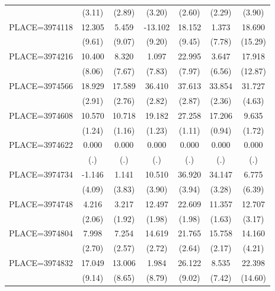{\begin{tabular}{l*{6}{c}}
                    &      (3.11)&      (2.89)&      (3.20)&      (2.60)&      (2.29)&      (3.90)\\
PLACE=3974118       &      12.305&       5.459&     -13.102&      18.152&       1.373&      18.690\\
                    &      (9.61)&      (9.07)&      (9.20)&      (9.45)&      (7.78)&     (15.29)\\
PLACE=3974216       &      10.400&       8.320&       1.097&      22.995&       3.647&      17.918\\
                    &      (8.06)&      (7.67)&      (7.83)&      (7.97)&      (6.56)&     (12.87)\\
PLACE=3974566       &      18.929&      17.589&      36.410&      37.613&      33.854&      31.727\\
                    &      (2.91)&      (2.76)&      (2.82)&      (2.87)&      (2.36)&      (4.63)\\
PLACE=3974608       &      10.570&      10.718&      19.182&      27.258&      17.206&       9.635\\
                    &      (1.24)&      (1.16)&      (1.23)&      (1.11)&      (0.94)&      (1.72)\\
PLACE=3974622       &       0.000&       0.000&       0.000&       0.000&       0.000&       0.000\\
                    &         (.)&         (.)&         (.)&         (.)&         (.)&         (.)\\
PLACE=3974734       &      -1.146&       1.141&      10.510&      36.920&      34.147&       6.775\\
                    &      (4.09)&      (3.83)&      (3.90)&      (3.94)&      (3.28)&      (6.39)\\
PLACE=3974748       &       4.216&       3.217&      12.497&      22.609&      11.357&      12.707\\
                    &      (2.06)&      (1.92)&      (1.98)&      (1.98)&      (1.63)&      (3.17)\\
PLACE=3974804       &       7.998&       7.254&      14.619&      21.765&      15.758&      14.160\\
                    &      (2.70)&      (2.57)&      (2.72)&      (2.64)&      (2.17)&      (4.21)\\
PLACE=3974832       &      17.049&      13.006&       1.984&      26.122&       8.535&      22.398\\
                    &      (9.14)&      (8.65)&      (8.79)&      (9.02)&      (7.42)&     (14.60)\\

\end{tabular}}

